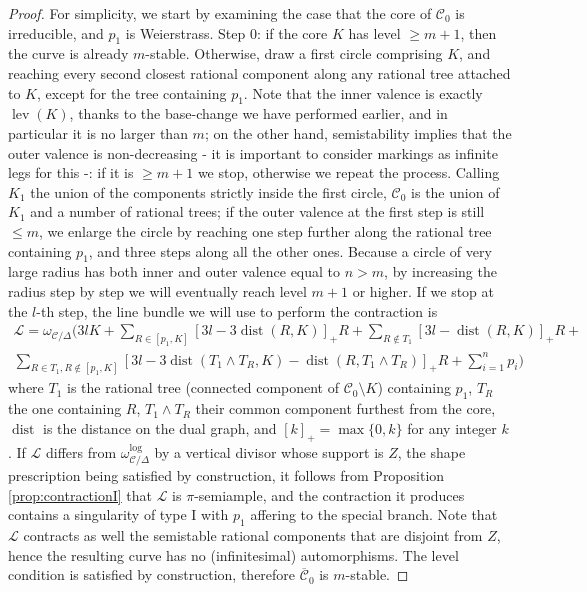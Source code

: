 \documentclass[11pt]{amsart}
\newcommand{\dvr}{\Delta}
\newcommand{\dist}{\operatorname{dist}}
\newcommand{\lev}{\operatorname{lev}}
\theoremstyle{plain}
\theoremstyle{definition}
\begin{document}
\begin{proof}
  For simplicity, we start by examining the case that the core of $\mathcal C_0$ is irreducible, and $p_1$ is Weierstrass. Step $0$: if the core $K$ has level $\geq m+1$, then the curve is already $m$-stable. Otherwise, draw a first circle comprising $K$, and reaching every second closest rational component along any rational tree attached to $K$, except for the tree containing $p_1$. Note that the inner valence is exactly $\lev(K)$, thanks to the base-change we have performed earlier, and in particular it is no larger than $m$; on the other hand, semistability implies that the outer valence is non-decreasing - it is important to consider markings as infinite legs for this -: if it is $\geq m+1$ we stop, otherwise we repeat the process. Calling $K_1$ the union of the components strictly inside the first circle, $\mathcal C_0$ is the union of $K_1$ and a number of rational trees; if the outer valence at the first step is still $\leq m$, we enlarge the circle by reaching one step further along the rational tree containing $p_1$, and three steps along all the other ones. Because a circle of very large radius has both inner and outer valence equal to $n>m$, by increasing the radius step by step we will eventually reach level $m+1$ or higher. If we stop at the $l$-th step, the line bundle we will use to perform the contraction is
  \begin{multline*}
  \mathcal L=\omega_{\mathcal C/\dvr}(3l K + \sum_{R\in [p_1,K]}[3l-3\dist(R,K)]_+R +\sum_{R\notin T_1}[3l-\dist(R,K)]_+R +\\
  \sum_{R\in T_1,R\notin [p_1,K]}[3l-3\dist(T_1\wedge T_R,K)-\dist(R,T_1\wedge T_R)]_+R+ \sum_{i=1}^np_i)
  \end{multline*}
  where $T_1$ is the rational tree (connected component of $\mathcal C_0\setminus K$) containing $p_1$, $T_R$ the one containing $R$, $T_1\wedge T_R$ their common component furthest from the core, $\dist$ is the distance on the dual graph, and $[k]_+=\max\{0,k\}$ for any integer $k$. If $\mathcal L$ differs from $\omega_{\mathcal C/\dvr}^{\text{log}}$ by a vertical divisor whose support is $Z$, the shape prescription being satisfied by construction, it follows from Proposition \ref{prop:contractionI} that $\mathcal L$ is $\pi$-semiample, and the contraction it produces contains a singularity of type I with $p_1$ affering to the special branch. Note that $\mathcal L$ contracts as well the semistable rational components that are disjoint from $Z$, hence the resulting curve has no (infinitesimal) automorphisms. The level condition is satisfied by construction, therefore $\overline{\mathcal C}_0$ is $m$-stable.
  

\end{proof}
\end{document}
